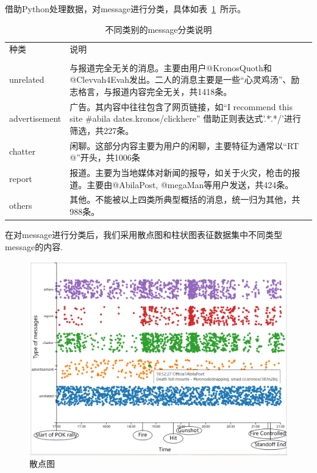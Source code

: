 \documentclass[a4paper]{article}
\begin{document}
借助Python处理数据，对message进行分类，具体如表~\ref{tab:table1}~所示。
\begin{table}[H]
  \caption{不同类别的message分类说明}\label{tab:table1}
  \vspace{0.5em}\centering
  \begin{tabular}{|p{2.2cm}<{\raggedright}|p{8.5cm}<{\raggedright}|}
    \toprule[1.5pt]
    种类          & 说明                                                                                                                                      \\                                                                                                                               \\
    \midrule[1pt]
    unrelated     & 与报道完全无关的消息。主要由用户@KronosQuoth和@Clevvah4Evah发出。二人的消息主要是一些“心灵鸡汤”、励志格言，与报道内容完全无关，共1418条。 \\ \hline
    advertisement & 广告。其内容中往往包含了网页链接，如“I recommend this site \#abila dates.kronos/clickhere” 借助正则表达式'.*\..*/'进行筛选，共227条。     \\ \hline
    chatter       & 闲聊。这部分内容主要为用户的闲聊，主要特征为通常以“RT @”开头，共1006条                                                                    \\ \hline
    report        & 报道。主要为当地媒体对新闻的报导，如关于火灾，枪击的报道。主要由@AbilaPost, @megaMan等用户发送，共424条。                                 \\ \hline
    others        & 其他。不能被以上四类所典型概括的消息，统一归为其他，共988条。                                                                             \\ \hline
    \bottomrule[1.5pt]
  \end{tabular}
  \vspace{\baselineskip}
\end{table}
在对message进行分类后，我们采用散点图和柱状图表征数据集中不同类型message的内容.
\begin{figure}[H]
  \centering
  \includegraphics[width=1\textwidth]{images/1-scatter-2.png}
  \caption{散点图}\label{fig:1-scatter}
  \vspace{\baselineskip}
\end{figure}
\end{document}
